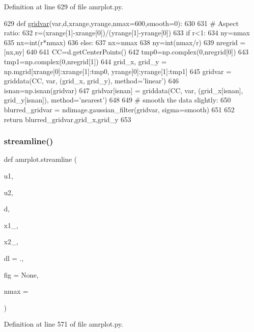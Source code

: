 Definition at line 629 of file amrplot.\+py.


\begin{DoxyCode}
629 \textcolor{keyword}{def }\hyperlink{namespaceamrplot_aa8e7367464df74565e4c8ab85660def0}{gridvar}(var,d,xrange,yrange,nmax=600,smooth=0):
630 
631     \textcolor{comment}{# Aspect ratio:}
632     r=(xrange[1]-xrange[0])/(yrange[1]-yrange[0])
633     \textcolor{keywordflow}{if} r<1:
634         ny=nmax
635         nx=int(r*nmax)
636     \textcolor{keywordflow}{else}:
637         nx=nmax
638         ny=int(nmax/r)
639     nregrid = [nx,ny]
640     
641     CC=d.getCenterPoints()
642     tmp0=np.complex(0,nregrid[0])
643     tmp1=np.complex(0,nregrid[1])
644     grid\_x, grid\_y = np.mgrid[xrange[0]:xrange[1]:tmp0, yrange[0]:yrange[1]:tmp1]
645     gridvar = griddata(CC, var, (grid\_x, grid\_y), method=\textcolor{stringliteral}{'linear'})
646     isnan=np.isnan(gridvar)
647     gridvar[isnan] = griddata(CC, var, (grid\_x[isnan], grid\_y[isnan]), method=\textcolor{stringliteral}{'nearest'})
648 
649 \textcolor{comment}{# smooth the data slightly:}
650     blurred\_gridvar = ndimage.gaussian\_filter(gridvar, sigma=smooth)
651 
652     \textcolor{keywordflow}{return} blurred\_gridvar,grid\_x,grid\_y
653 \end{DoxyCode}
\mbox{\label{namespaceamrplot_a214eccffe1d56a25d80925cc453f5a23}} 
\subsubsection{\texorpdfstring{streamline()}{streamline()}}
{\footnotesize\ttfamily def amrplot.\+streamline (\begin{DoxyParamCaption}\item[{}]{u1,  }\item[{}]{u2,  }\item[{}]{d,  }\item[{}]{x1\+\_,  }\item[{}]{x2\+\_,  }\item[{}]{dl = {.},  }\item[{}]{fig = {\ttfamily None},  }\item[{}]{nmax = {} }\end{DoxyParamCaption})}



Definition at line 571 of file amrplot.\+py.


